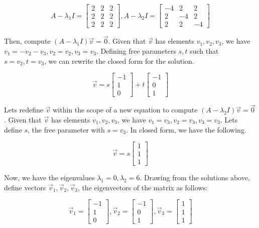 \documentclass[11pt]{article}
\begin{document}
$$A-\lambda_1I=\begin{bmatrix}2 & 2 & 2\\2 & 2 & 2\\2 & 2 & 2\end{bmatrix},A-\lambda_2I=\begin{bmatrix}-4 & 2 & 2\\2 & -4 & 2\\2 & 2 & -4\end{bmatrix}$$

Then, compute $(A-\lambda_1I)\vec{v}=\vec{0}$. Given that $\vec{v}$ has elements $v_1,v_2,v_3$, we have $v_1=-v_2-v_3,v_2=v_2,v_3=v_3$. Defining free parameters $s,t$ such that $s=v_2,t=v_3$, we can rewrite the closed form for the solution.

$$\vec{v}=s\begin{bmatrix}
-1\\
1\\
0
\end{bmatrix}+t\begin{bmatrix}
-1\\
0\\
1
\end{bmatrix}$$

Lets redefine $\vec{v}$ within the scope of a new equation to compute $(A-\lambda_2I)\vec{v}=\vec{0}$. Given that $\vec{v}$ has elements $v_1,v_2,v_3$, we have $v_1=v_3,v_2=v_3,v_3=v_3$. Lets define $s$, the free parameter with $s=v_3$. In closed form, we have the following.

$$\vec{v}=s\begin{bmatrix}1\\1\\1\end{bmatrix}$$

Now, we have the eigenvalues $\lambda_1=0,\lambda_2=6$. Drawing from the solutions above, define vectors $\vec{v}_1,\vec{v}_2,\vec{v}_3$, the eigenvectors of the matrix as follows:

$$\vec{v}_1=\begin{bmatrix}-1\\1\\0\end{bmatrix},
\vec{v}_2=\begin{bmatrix}-1\\0\\1\end{bmatrix},
\vec{v}_3=\begin{bmatrix}1\\1\\1\end{bmatrix}$$
\end{document}

